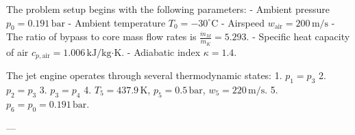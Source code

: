 The problem setup begins with the following parameters:  
- Ambient pressure \( p_0 = 0.191 \, \text{bar} \)  
- Ambient temperature \( T_0 = -30^\circ\text{C} \)  
- Airspeed \( w_{\text{air}} = 200 \, \text{m/s} \)  
- The ratio of bypass to core mass flow rates is \( \frac{\dot{m}_M}{\dot{m}_K} = 5.293 \).  
- Specific heat capacity of air \( c_{p,\text{air}} = 1.006 \, \text{kJ/kg·K} \).  
- Adiabatic index \( \kappa = 1.4 \).  

The jet engine operates through several thermodynamic states:  
1. \( p_1 = p_3 \)  
2. \( p_2 = p_3 \)  
3. \( p_3 = p_4 \)  
4. \( T_5 = 437.9 \, \text{K} \), \( p_5 = 0.5 \, \text{bar} \), \( w_5 = 220 \, \text{m/s} \).  
5. \( p_6 = p_0 = 0.191 \, \text{bar} \).  

---